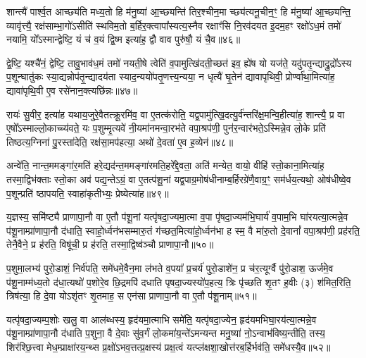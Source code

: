 शान्त्यै॑ पार्श्व॒त आच्छ्य॑ति मध्य॒तो हि म॑नु॒ष्या॑ आ॒च्छ्यन्ति॑ तिर॒श्चीन॒मा च्छ्य॑त्यनू॒चीन॒ꣳ॒ हि म॑नु॒ष्या॑ आ॒च्छ्यन्ति॒ व्यावृ॑त्त्यै॒ रक्ष॑साम्भा॒गो॑\-ऽसीति॑ स्थविम॒तो ब॒र्\mbox{}हिर॒क्त्वापा᳚स्यत्य॒स्नैव रक्षाꣳ॑सि नि॒रव॑दयत इ॒दम॒हꣳ रक्षो॑\-ऽध॒मं तमो॑ नयामि॒ यो᳚\-ऽस्मान्द्वेष्टि॒ यं च॑ व॒यं द्वि॒ष्म इत्या॑ह॒ द्वौ वाव पुरु॑षौ॒ यं चै॒व॥४६॥

द्वे॒ष्टि॒ यश्चै॑नं॒ द्वेष्टि॒ तावु॒भाव॑ध॒मं तमो॑ नयती॒षे त्वेति॑ व॒पामुत्खि॑दती॒च्छत॑ इव॒ ह्ये॑ष यो यज॑ते॒ यदु॑पतृ॒न्द्याद्रु॒द्रो᳚\-ऽस्य प॒शून्घातु॑कः स्या॒द्यन्नोप॑तृ॒न्द्यादय॑ता स्याद॒न्ययो॑पतृ॒णत्त्य॒न्यया॒ न धृत्यै॑ घृ॒तेन॑ द्यावापृथिवी॒ प्रोर्ण्वा॑था॒मित्या॑ह॒ द्यावा॑पृथि॒वी ए॒व रसे॑नान॒क्त्यछि॑न्नः॥४७॥

रायः॑ सु॒वीर॒ इत्या॑ह यथाय॒जुरे॒वैतत्क्रू॒रमि॑व॒ वा ए॒तत्क॑रोति॒ यद्व॒पामु॑त्खि॒दत्यु॒र्व॑न्तरि॑क्ष॒मन्वि॒हीत्या॑ह॒ शान्त्यै॒ प्र वा ए॒षो᳚\-ऽस्माल्लो॒काच्च्य॑वते॒ यः प॒शुम्मृ॒त्यवे॑ नी॒यमा॑नमन्वा॒रभ॑ते वपा॒श्रप॑णी॒ पुन॑र॒न्वार॑भते॒\-ऽस्मिन्ने॒व लो॒के प्रति॑ तिष्ठत्य॒ग्निना॑ पु॒रस्ता॑देति॒ रक्ष॑सा॒मप॑हत्या॒ अथो॑ दे॒वता॑ ए॒व ह॒व्येन॑॥४८॥

अन्वे॑ति॒ नान्त॒ममङ्गा॑र॒मति॑ हरे॒द्यद॑न्त॒ममङ्गा॑रमति॒हरे᳚द्दे॒वता॒ अति॑ मन्येत॒ वायो॒ वीहि॑ स्तो॒काना॒मित्या॑ह॒ तस्मा॒द्विभ॑क्ताः स्तो॒का अव॑ पद्य॒न्ते\-ऽग्रं॒ वा ए॒तत्प॑शू॒नां यद्व॒पाग्र॒मोष॑धीनाम्ब॒र्\mbox{}हिरग्रे॑णै॒वाग्र॒ꣳ॒ सम॑र्धय॒त्यथो॒ ओष॑धीष्वे॒व प॒शून्प्रति॑ ष्ठापयति॒ स्वाहा॑कृतीभ्यः॒ प्रेष्येत्या॑ह॥४९॥

य॒ज्ञस्य॒ समि॑ष्ट्यै प्राणापा॒नौ वा ए॒तौ प॑शू॒नां यत्पृ॑षदा॒ज्यमा॒त्मा व॒पा पृ॑षदा॒ज्यम॑भि॒घार्य॑ व॒पाम॒भि घा॑रयत्या॒त्मन्ने॒व प॑शू॒नाम्प्रा॑णापा॒नौ द॑धाति॒ स्वाहो॒र्ध्वन॑भसम्मारु॒तं ग॑च्छत॒मित्या॑हो॒र्ध्वन॑भा ह स्म॒ वै मा॑रु॒तो दे॒वानां᳚ वपा॒श्रप॑णी॒ प्रह॑रति॒ तेनै॒वैने॒ प्र ह॑रति॒ विषू॑ची॒ प्र ह॑रति॒ तस्मा॒द्विष्व॑ञ्चौ प्राणापा॒नौ॥५०॥

{\anuvakamend[{स्वधि॑तिश्चै॒वाच्छि॑न्नो ह॒व्येने॒ष्येत्या॑ह॒ षट्च॑त्वारिꣳशच्च॥९॥}]}

प॒शुमा॒लभ्य॑ पुरो॒डाशं॒ निर्व॑पति॒ समे॑धमे॒वैन॒मा ल॑भते व॒पया᳚ प्र॒चर्य॑ पुरो॒डाशे॑न॒ प्र च॑र॒त्यूर्ग्वै पु॑रो॒डाश॒ ऊर्ज॑मे॒व प॑शू॒नाम्म॑ध्य॒तो द॑धा॒त्यथो॑ प॒शोरे॒व छि॒द्रमपि॑ दधाति पृषदा॒ज्यस्यो॑प॒हत्य॒ त्रिः पृ॑च्छति शृ॒तꣳ ह॒वीः (३) श॑मित॒रिति॒ त्रिष॑त्या॒ हि दे॒वा यो\-ऽशृ॑तꣳ शृ॒तमाह॒ स एन॑सा प्राणापा॒नौ वा ए॒तौ प॑शू॒नाम्॥५१॥

यत्पृ॑षदा॒ज्यम्प॒शोः खलु॒ वा आल॑ब्धस्य॒ हृद॑यमा॒त्माभि समे॑ति॒ यत्पृ॑षदा॒ज्येन॒ हृद॑यमभिघा॒रय॑त्या॒त्मन्ने॒व प॑शू॒नाम्प्रा॑णापा॒नौ द॑धाति प॒शुना॒ वै दे॒वाः सु॑व॒र्गं लो॒कमा॑य॒न्ते॑\-ऽमन्यन्त मनु॒ष्या॑ नो॒\-ऽन्वाभ॑विष्य॒न्तीति॒ तस्य॒ शिर॑श्छि॒त्त्वा मेध॒म्प्राक्षा॑रय॒न्थ्स प्र॒क्षो॑\-ऽभव॒त्तत्प्र॒क्षस्य॑ प्रक्ष॒त्वं यत्प्ल॑क्षशा॒खोत्त॑रब॒र्\mbox{}हिर्भव॑ति॒ समे॑धस्यै॒व॥५२॥

